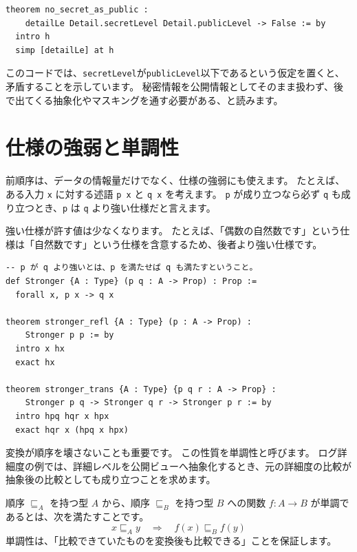 \begin{listing}[htbp]
\begin{verbatim}
theorem no_secret_as_public :
    detailLe Detail.secretLevel Detail.publicLevel -> False := by
  intro h
  simp [detailLe] at h
\end{verbatim}
\caption{\texttt{no\_secret\_as\_public}}
\label{lst:ch22-no-downgrade}
\end{listing}

このコードでは、\texttt{secretLevel}が\texttt{publicLevel}以下であるという仮定を置くと、矛盾することを示しています。
秘密情報を公開情報としてそのまま扱わず、後で出てくる抽象化やマスキングを通す必要がある、と読みます。

\section{仕様の強弱と単調性}

前順序は、データの情報量だけでなく、仕様の強弱にも使えます。
たとえば、ある入力 \texttt{x} に対する述語 \texttt{p x} と \texttt{q x} を考えます。
\texttt{p} が成り立つなら必ず \texttt{q} も成り立つとき、\texttt{p} は \texttt{q} より強い仕様だと言えます。

強い仕様が許す値は少なくなります。
たとえば、「偶数の自然数です」という仕様は「自然数です」という仕様を含意するため、後者より強い仕様です。

\begin{listing}[htbp]
\begin{verbatim}
-- p が q より強いとは、p を満たせば q も満たすということ。
def Stronger {A : Type} (p q : A -> Prop) : Prop :=
  forall x, p x -> q x

theorem stronger_refl {A : Type} (p : A -> Prop) :
    Stronger p p := by
  intro x hx
  exact hx

theorem stronger_trans {A : Type} {p q r : A -> Prop} :
    Stronger p q -> Stronger q r -> Stronger p r := by
  intro hpq hqr x hpx
  exact hqr x (hpq x hpx)
\end{verbatim}
\caption{\texttt{Stronger}}
\label{lst:ch22-stronger-spec}
\end{listing}

変換が順序を壊さないことも重要です。
この性質を単調性と呼びます。
ログ詳細度の例では、詳細レベルを公開ビューへ抽象化するとき、元の詳細度の比較が抽象後の比較としても成り立つことを求めます。

順序 \(\sqsubseteq_A\) を持つ型 \(A\) から、順序 \(\sqsubseteq_B\) を持つ型 \(B\) への関数 \(f : A \to B\) が単調であるとは、次を満たすことです。
\[
  x \sqsubseteq_A y \quad\Rightarrow\quad f(x) \sqsubseteq_B f(y)
\]
単調性は、「比較できていたものを変換後も比較できる」ことを保証します。

